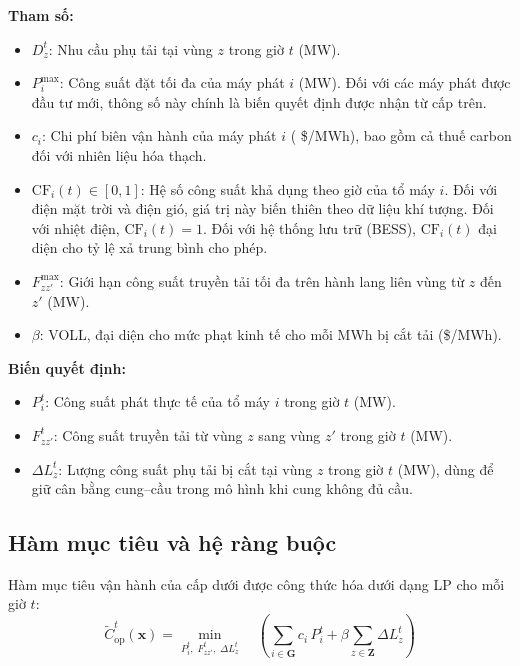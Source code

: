 \textbf{Tham số:}
\begin{itemize}
    \item $D_z^t$: Nhu cầu phụ tải tại vùng $z$ trong giờ $t$ (MW).
    \item $P_i^{\max}$: Công suất đặt tối đa của máy phát $i$ (MW). Đối với các máy phát được đầu tư mới, thông số này chính là biến quyết định được nhận từ cấp trên.
    \item $c_i$: Chi phí biên vận hành của máy phát $i$ ( \$/MWh), bao gồm cả thuế carbon đối với nhiên liệu hóa thạch.
    \item $\text{CF}_i(t) \in [0, 1]$: Hệ số công suất khả dụng theo giờ của tổ máy $i$. Đối với điện mặt trời và điện gió, giá trị này biến thiên theo dữ liệu khí tượng. Đối với nhiệt điện, $\text{CF}_i(t) = 1$. Đối với hệ thống lưu trữ (BESS), $\text{CF}_i(t)$ đại diện cho tỷ lệ xả trung bình cho phép.
    \item $F_{zz'}^{\max}$: Giới hạn công suất truyền tải tối đa trên hành lang liên vùng từ $z$ đến $z'$ (MW).
    \item $\beta$: VOLL, đại diện cho mức phạt kinh tế cho mỗi MWh bị cắt tải (\$/MWh).
\end{itemize}

\textbf{Biến quyết định:}
\begin{itemize}
    \item $P_i^t$: Công suất phát thực tế của tổ máy $i$ trong giờ $t$ (MW).
    \item $F_{zz'}^t$: Công suất truyền tải từ vùng $z$ sang vùng $z'$ trong giờ $t$ (MW).
    \item $\Delta L_z^t$: Lượng công suất phụ tải bị cắt tại vùng $z$ trong giờ $t$ (MW), dùng để giữ cân bằng cung--cầu trong mô hình khi cung không đủ cầu.
\end{itemize}

\subsection{Hàm mục tiêu và hệ ràng buộc}

Hàm mục tiêu vận hành của cấp dưới được công thức hóa dưới dạng LP cho mỗi giờ $t$:
\begin{equation}
    \tilde{C}_{\text{op}}^t(\mathbf{x}) = \min_{P_i^t,\; F_{zz'}^t,\; \Delta L_z^t} \quad \left( \sum_{i \in \mathbf{G}} c_i \, P_i^t + \beta \sum_{z \in \mathbf{Z}} \Delta L_z^t \right)
    \label{eq:lower_objective}
\end{equation}

